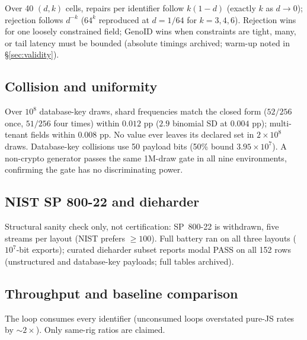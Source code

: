 \documentclass{svproc}
\begin{document}
Over 40 $(d,k)$ cells, repairs per identifier follow $k(1-d)$ (exactly $k$ as $d \to 0$); rejection follows $d^{-k}$ ($64^k$ reproduced at $d=1/64$ for $k=3,4,6$). Rejection wins for one loosely constrained field; GenoID wins when constraints are tight, many, or tail latency must be bounded (absolute timings archived; warm-up noted in \S\ref{sec:validity}).

\subsection{Collision and uniformity}
Over $10^8$ database-key draws, shard frequencies match the closed form ($52/256$ once, $51/256$ four times) within $0.012$ pp ($2.9$ binomial SD at $0.004$ pp); multi-tenant fields within $0.008$ pp. No value ever leaves its declared set in $2\times10^8$ draws. Database-key collisions use 50 payload bits (50\% bound $3.95\times10^7$). A non-crypto generator passes the same 1M-draw gate in all nine environments, confirming the gate has no discriminating power.

\subsection{NIST SP 800-22 and dieharder}
\label{sec:nist}
Structural sanity check only, not certification: SP~800-22 is withdrawn, five streams per layout (NIST prefers $\geq 100$). Full battery ran on all three layouts ($10^7$-bit exports); curated dieharder subset reports modal PASS on all 152 rows (unstructured and database-key payloads; full tables archived).

\subsection{Throughput and baseline comparison}
\label{sec:throughput}

The loop consumes every identifier (unconsumed loops overstated pure-JS rates by $\sim2\times$). Only same-rig ratios are claimed.
\end{document}
